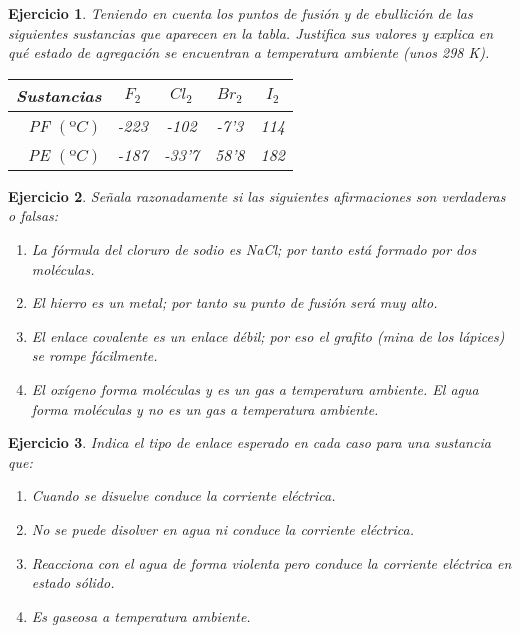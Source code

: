 \documentclass[11pt,twoside,a4paper]{article}
\theoremstyle{problem}
\newtheorem{prob}{Ejercicio}[section]
\begin{document}
\begin{prob}
Teniendo en cuenta los puntos de fusión y de ebullición de las siguientes sustancias que aparecen en la tabla. 
Justifica sus valores y explica en qué estado de agregación se encuentran a temperatura ambiente (unos 298 K).
\vspace{8pt}

\begin{tabular}{|r|c|c|c|c|}
\hline
Sustancias& $F_2$& $Cl_2$& $Br_2$& $I_2$\\
\hline
PF $(ºC)$	&-223	&-102	&-7'3		&114\\
\hline
PE $(ºC)$	&-187	&-33'7	&58'8	&182\\
\hline
\end{tabular}

\end{prob}


\begin{prob}
Señala razonadamente si las siguientes afirmaciones son verdaderas o falsas:
\begin{enumerate}
\item La fórmula del cloruro de sodio es NaCl; por tanto está formado por dos moléculas.
\item El hierro es un metal; por tanto su punto de fusión será muy alto.
\item El enlace covalente es un enlace débil; por eso el grafito (mina de los lápices) se rompe fácilmente.
\item El oxígeno forma moléculas y es un gas a temperatura ambiente. El agua forma moléculas y no es un 
gas a temperatura ambiente.
\end{enumerate}
\end{prob}


\begin{prob}
Indica el tipo de enlace esperado en cada caso para una sustancia que:
\begin{enumerate}
\item Cuando se disuelve conduce la corriente eléctrica.
\item No se puede disolver en agua ni conduce la corriente eléctrica.
\item Reacciona con el agua de forma violenta pero conduce la corriente eléctrica en estado sólido.
\item Es gaseosa a temperatura ambiente.
\end{enumerate}
\end{prob}
\end{document}
